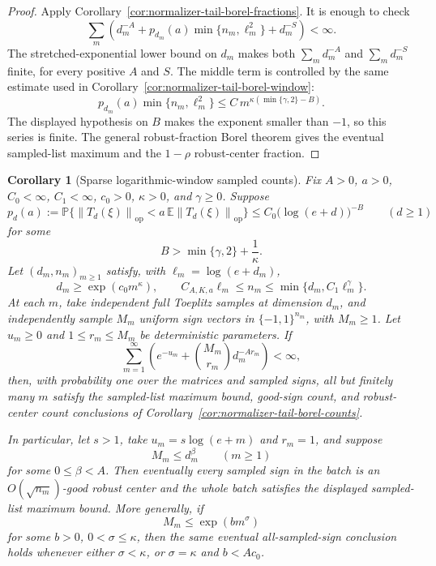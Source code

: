 \documentclass[11pt]{amsart}
\numberwithin{equation}{section}
\newtheorem{corollary}[theorem]{Corollary}
\theoremstyle{definition}
\theoremstyle{remark}
\newcommand{\op}{\mathrm{op}}
\newcommand{\Prob}{\mathbb P}
\newcommand{\Exp}{\mathbb E}
\newcommand{\norm}[1]{\left\lVert #1\right\rVert}
\begin{document}
\begin{proof}
Apply Corollary~\ref{cor:normalizer-tail-borel-fractions}.  It is enough to
check
\[
  \sum_m\left(d_m^{-A}
  +p_{d_m}(a)\min\{n_m,\ell_m^2\}
  +d_m^{-S}\right)<\infty .
\]
The stretched-exponential lower bound on \(d_m\) makes both
\(\sum_m d_m^{-A}\) and \(\sum_m d_m^{-S}\) finite, for every positive \(A\)
and \(S\).  The middle term is controlled by the same estimate used in
Corollary~\ref{cor:normalizer-tail-borel-window}:
\[
  p_{d_m}(a)\min\{n_m,\ell_m^2\}
  \le C\,m^{\kappa(\min\{\gamma,2\}-B)}.
\]
The displayed hypothesis on \(B\) makes the exponent smaller than \(-1\), so
this series is finite.  The general robust-fraction Borel theorem gives the
eventual sampled-list maximum and the \(1-\rho\) robust-center fraction.
\end{proof}

\begin{corollary}[Sparse logarithmic-window sampled counts]
\label{cor:normalizer-tail-borel-window-counts}
Fix \(A>0\), \(a>0\), \(C_0<\infty\), \(C_1<\infty\), \(c_0>0\),
\(\kappa>0\), and \(\gamma\ge0\).  Suppose
\[
  p_d(a):=\Prob\{\norm{T_d(\xi)}_{\op}<a\,\Exp\norm{T_d(\xi)}_{\op}\}
  \le C_0\bigl(\log(e+d)\bigr)^{-B}
  \qquad(d\ge1)
\]
for some
\[
  B>\min\{\gamma,2\}+\frac1\kappa .
\]
Let \((d_m,n_m)_{m\ge1}\) satisfy, with \(\ell_m=\log(e+d_m)\),
\[
  d_m\ge\exp(c_0m^\kappa),\qquad
  C_{A,K,a}\ell_m\le n_m\le \min\{d_m,C_1\ell_m^\gamma\}.
\]
At each \(m\), take independent full Toeplitz samples at dimension \(d_m\), and
independently sample \(M_m\) uniform sign vectors in \(\{-1,1\}^{n_m}\), with
\(M_m\ge1\).  Let \(u_m\ge0\) and \(1\le r_m\le M_m\) be deterministic
parameters.  If
\[
  \sum_{m=1}^{\infty}
  \left(e^{-u_m}+\binom{M_m}{r_m}d_m^{-A r_m}\right)<\infty,
\]
then, with probability one over the matrices and sampled signs, all but
finitely many \(m\) satisfy the sampled-list maximum bound, good-sign count, and
robust-center count conclusions of
Corollary~\ref{cor:normalizer-tail-borel-counts}.

In particular, let \(s>1\), take \(u_m=s\log(e+m)\) and \(r_m=1\), and suppose
\[
  M_m\le d_m^\beta
  \qquad(m\ge1)
\]
for some \(0\le\beta<A\).  Then eventually every sampled sign in the batch is
an \(O(\sqrt{n_m})\)-good robust center and the whole batch satisfies the
displayed sampled-list maximum bound.  More generally, if
\[
  M_m\le \exp(bm^\sigma)
\]
for some \(b>0\), \(0<\sigma\le\kappa\), then the same eventual all-sampled-sign
conclusion holds whenever either \(\sigma<\kappa\), or \(\sigma=\kappa\) and
\(b<Ac_0\).
\end{corollary}
\end{document}
